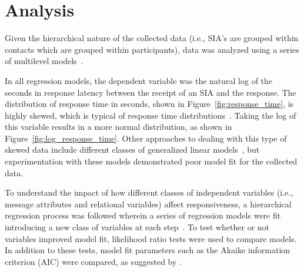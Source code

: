 \documentclass[12pt]{nuthesis}	%
\begin{document}

\section{Analysis}

Given the hierarchical nature of the collected data (i.e., SIA's are grouped within contacts which are grouped within participants), data was analyzed using a series of multilevel models~\citep{gelman2007data}.

In all regression models, the dependent variable was the natural log of the seconds in response latency between the receipt of an SIA and the response. The distribution of response time in seconds, shown in Figure~\ref{fig:response_time}, is highly skewed, which is typical of response time distributions~\citep{kalman2006pauses}. Taking the log of this variable results in a more normal distribution, as shown in Figure~\ref{fig:log_response_time}. Other approaches to dealing with this type of skewed data include different classes of generalized linear models~\citep[see e.g.,][]{buntin2004too,dick2004beyond,manning2001estimating}, but experimentation with these models demonstrated poor model fit for the collected data.

To understand the impact of how different classes of independent variables (i.e., message attributes and relational variables) affect responsiveness, a hierarchical regression process was followed wherein a series of regression models were fit introducing a new class of variables at each step~\citep{gurnsey2017statistics}. To test whether or not variables improved model fit, likelihood ratio tests were used to compare models. In addition to these tests, model fit parameters such as the Akaike information criterion (AIC) were compared, as suggested by \citet{gelman2007data}.
\end{document}
